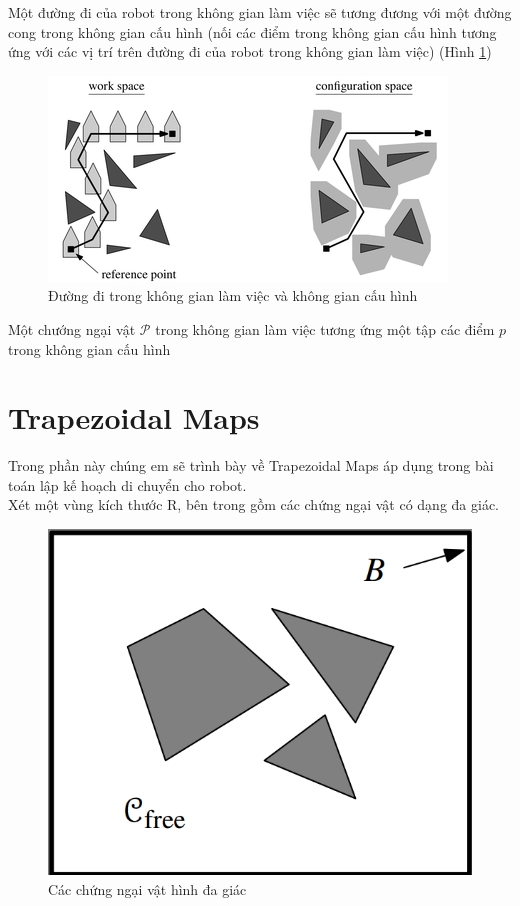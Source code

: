 \documentclass[a4paper,12pt]{report}
\begin{document}
\par Một đường đi của robot trong không gian làm việc sẽ tương đương với một đường cong trong không gian cấu hình (nối các điểm trong không gian cấu hình tương ứng với các vị trí trên đường đi của robot trong không gian làm việc) (Hình \ref{fig_path})
\begin{figure}[H]
\label{fig_path}
\centering
\includegraphics[scale=1]{path.png}
\caption{Đường đi trong không gian làm việc và không gian cấu hình}
\end{figure}
\par Một chướng ngại vật $\mathcal{P}$ trong không gian làm việc tương ứng một tập các điểm $p$ trong không gian cấu hình 
\section{Trapezoidal Maps}
Trong phần này chúng em sẽ trình bày về Trapezoidal Maps áp dụng trong bài toán lập kế hoạch di chuyển cho robot.\\

Xét một vùng kích thước R, bên trong gồm các chứng ngại vật có dạng đa giác. 
\begin{figure}[H]
\label{object_pic}
\centering
\includegraphics[scale=0.4]{normal.png}
\caption{Các chứng ngại vật hình đa giác}
\end{figure}
\end{document}
